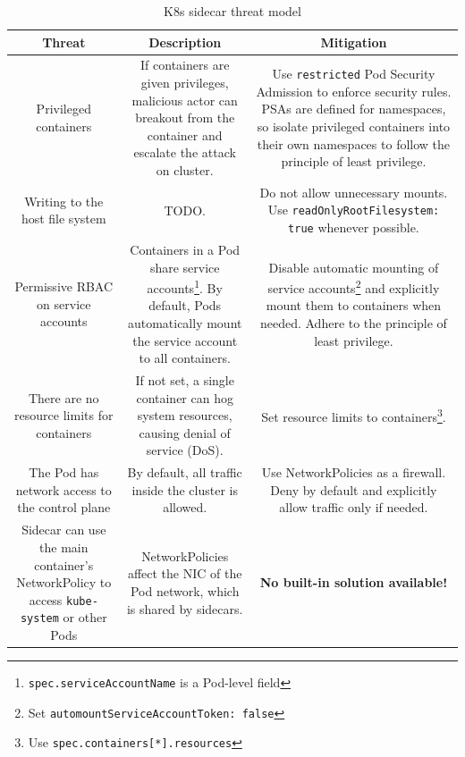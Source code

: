 \documentclass[english, 12pt, a4paper, sci, utf8, a-2b, online]{aaltothesis}
\begin{document}
\begin{table}[H]
  \sffamily%
  \centering

  \caption{K8s sidecar threat model}
  \label{table:threat-model}

  \begin{minipage}{\textwidth}
  \renewcommand{\thempfootnote}{\arabic{mpfootnote}}
  \begin{tabularx}{\textwidth}{CCC}
    \hline
    \textbf{Threat} & \textbf{Description} & \textbf{Mitigation}\\ \hline
    Privileged containers & If containers are given privileges, malicious actor can breakout from the container and escalate the attack on cluster. & Use \texttt{restricted} Pod Security Admission to enforce security rules. PSAs are defined for namespaces, so isolate privileged containers into their own namespaces to follow the principle of least privilege. \\ \hline
    Writing to the host file system & TODO. & Do not allow unnecessary mounts. Use \texttt{readOnlyRootFilesystem: true} whenever possible. \\ \hline
    Permissive RBAC on service accounts & Containers in a Pod share service accounts\footnote{\texttt{spec.serviceAccountName} is a Pod-level field}. By default, Pods automatically mount the service account to all containers. & Disable automatic mounting of service accounts\footnote{Set \texttt{automountServiceAccountToken: false}} and explicitly mount them to containers when needed. Adhere to the principle of least privilege. \\ \hline
    There are no resource limits for containers & If not set, a single container can hog system resources, causing denial of service (DoS). & Set resource limits to containers\footnote{Use \texttt{spec.containers[*].resources}}. \\ \hline
    The Pod has network access to the control plane & By default, all traffic inside the cluster is allowed. & Use NetworkPolicies as a firewall. Deny by default and explicitly allow traffic only if needed. \\ \hline
    Sidecar can use the main container's NetworkPolicy to access \texttt{kube-system} or other Pods & NetworkPolicies affect the NIC of the Pod network, which is shared by sidecars. & \textbf{No built-in solution available!} \\ \hline

\end{tabularx}
\end{minipage}
\end{table}
\end{document}
